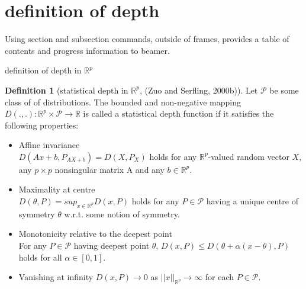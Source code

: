 \documentclass[aspectratio=169,ignorenonframetext,9pt]{beamer}
\theoremstyle{plain}
\theoremstyle{definition}
\newtheorem{defn}{Definition}[section]
\begin{document}
\section{definition of depth}
Using section and subsection commands, outside of frames, provides a table of contents and progress information to beamer.
\begin{frame}{definition of depth in $\mathbb{R}^p$}
\begin{defn}[statistical depth in $\mathbb{R}^p$, (Zuo and Serfling, 2000b)]
Let $\mathcal{P}$ be some class of of distributions.
The bounded and non-negative mapping $D(.,.): \mathbb{R}^p\times \mathcal{P} \rightarrow \mathbb{R}$ is called
a statistical depth function if it satisfies the following properties:
\begin{itemize}
    \item Affine invariance \\
        $D(Ax+b,P_{AX+b})=D(X,P_X)$ holds for any $\mathbb{R}^p$-valued random vector $X$,
        any $p\times p$ nonsingular matrix A and any $b\in \mathbb{R}^p$.
    \item Maximality at centre \\
        $D(\theta,P)=sup_{x\in\mathbb{R}^p}D(x,P)$ holds for any $P\in\mathcal{P}$
        having a unique centre of symmetry $\theta$ w.r.t. some notion of symmetry.
    \item Monotonicity relative to the deepest point \\
        For any $P \in \mathcal{P}$ having deepest point $\theta$, $D(x,P)\leq D(\theta+\alpha(x-\theta), P)$
        holds for all $\alpha\in[0,1]$.
    \item Vanishing at infinity
        $D(x,P)\rightarrow0$ as $||x||_{\mathbb{R}^p}\rightarrow\infty$
        for each $P\in\mathcal{P}$.
\end{itemize}
\end{defn}
\end{frame}
\end{document}
